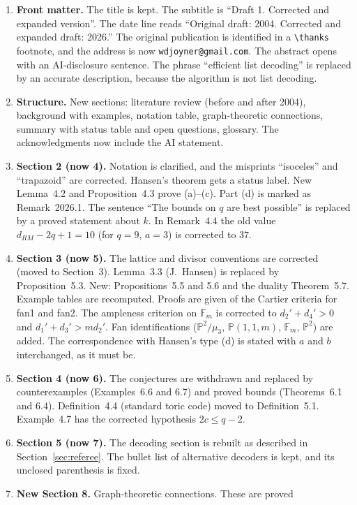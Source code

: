 \documentclass[12pt,letterpaper]{article}
\newcommand{\F}{\mathbb{F}}
\newcommand{\PP}{\mathbb{P}}
\begin{document}
\begin{enumerate}[leftmargin=*]
\item \textbf{Front matter.} The title is kept. The subtitle is ``Draft 1.
Corrected and expanded version''. The date line reads ``Original draft:
2004. Corrected and expanded draft: 2026.'' The original publication is
identified in a \verb|\thanks| footnote, and the address is now
\texttt{wdjoyner@gmail.com}. The abstract opens with an AI-disclosure
sentence. The phrase ``efficient list decoding'' is replaced by an accurate
description, because the algorithm is not list decoding.
\item \textbf{Structure.} New sections: literature review (before and after
2004), background with examples, notation table, graph-theoretic connections,
summary with status table and open questions, glossary. The acknowledgments
now include the AI statement.
\item \textbf{Section 2 (now 4).} Notation is clarified, and the misprints
``isoceles'' and ``trapazoid'' are corrected. Hansen's theorem gets a status
label. New Lemma~4.2 and Proposition~4.3 prove (a)--(c). Part (d) is marked
as Remark~2026.1. The sentence ``The bounds on $q$ are best possible'' is
replaced by a proved statement about $k$. In Remark~4.4 the old value
$d_{RM}-2q+1=10$ (for $q=9$, $a=3$) is corrected to $37$.
\item \textbf{Section 3 (now 5).} The lattice and divisor conventions are
corrected (moved to Section~3). Lemma~3.3 (J.~Hansen) is replaced by
Proposition~5.3. New: Propositions~5.5 and 5.6 and the duality
Theorem~5.7. Example tables are recomputed. Proofs are given of the Cartier
criteria for fan1 and fan2. The ampleness criterion on $\F_m$ is corrected to
$d_2'+d_4'>0$ and $d_1'+d_3'>md_2'$. Fan identifications ($\PP^2/\mu_3$,
$\PP(1,1,m)$, $\F_m$, $\PP^2$) are added. The correspondence with Hansen's
type (d) is stated with $a$ and $b$ interchanged, as it must be.
\item \textbf{Section 4 (now 6).} The conjectures are withdrawn and replaced
by counterexamples (Examples~6.6 and 6.7) and proved bounds
(Theorems~6.1 and 6.4). Definition~4.4 (standard toric code) moved to
Definition~5.1. Example~4.7 has the corrected hypothesis $2c\le q-2$.
\item \textbf{Section 5 (now 7).} The decoding section is rebuilt as
described in Section~\ref{sec:referee}. The bullet list of alternative
decoders is kept, and its unclosed parenthesis is fixed.
\item \textbf{New Section 8.} Graph-theoretic connections. These are proved

\end{enumerate}
\end{document}
